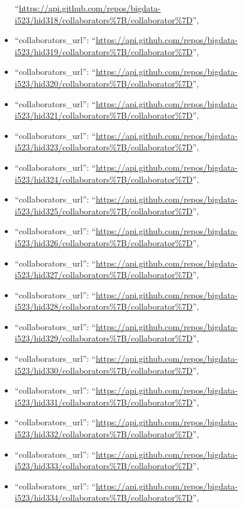 \begin{itemize}
  ``\url{https://api.github.com/repos/bigdata-i523/hid318/collaborators\%7B/collaborator\%7D}'',
\item
  ``collaborators\_url'':
  ``\url{https://api.github.com/repos/bigdata-i523/hid319/collaborators\%7B/collaborator\%7D}'',
\item
  ``collaborators\_url'':
  ``\url{https://api.github.com/repos/bigdata-i523/hid320/collaborators\%7B/collaborator\%7D}'',
\item
  ``collaborators\_url'':
  ``\url{https://api.github.com/repos/bigdata-i523/hid321/collaborators\%7B/collaborator\%7D}'',
\item
  ``collaborators\_url'':
  ``\url{https://api.github.com/repos/bigdata-i523/hid323/collaborators\%7B/collaborator\%7D}'',
\item
  ``collaborators\_url'':
  ``\url{https://api.github.com/repos/bigdata-i523/hid324/collaborators\%7B/collaborator\%7D}'',
\item
  ``collaborators\_url'':
  ``\url{https://api.github.com/repos/bigdata-i523/hid325/collaborators\%7B/collaborator\%7D}'',
\item
  ``collaborators\_url'':
  ``\url{https://api.github.com/repos/bigdata-i523/hid326/collaborators\%7B/collaborator\%7D}'',
\item
  ``collaborators\_url'':
  ``\url{https://api.github.com/repos/bigdata-i523/hid327/collaborators\%7B/collaborator\%7D}'',
\item
  ``collaborators\_url'':
  ``\url{https://api.github.com/repos/bigdata-i523/hid328/collaborators\%7B/collaborator\%7D}'',
\item
  ``collaborators\_url'':
  ``\url{https://api.github.com/repos/bigdata-i523/hid329/collaborators\%7B/collaborator\%7D}'',
\item
  ``collaborators\_url'':
  ``\url{https://api.github.com/repos/bigdata-i523/hid330/collaborators\%7B/collaborator\%7D}'',
\item
  ``collaborators\_url'':
  ``\url{https://api.github.com/repos/bigdata-i523/hid331/collaborators\%7B/collaborator\%7D}'',
\item
  ``collaborators\_url'':
  ``\url{https://api.github.com/repos/bigdata-i523/hid332/collaborators\%7B/collaborator\%7D}'',
\item
  ``collaborators\_url'':
  ``\url{https://api.github.com/repos/bigdata-i523/hid333/collaborators\%7B/collaborator\%7D}'',
\item
  ``collaborators\_url'':
  ``\url{https://api.github.com/repos/bigdata-i523/hid334/collaborators\%7B/collaborator\%7D}'',

\end{itemize}
